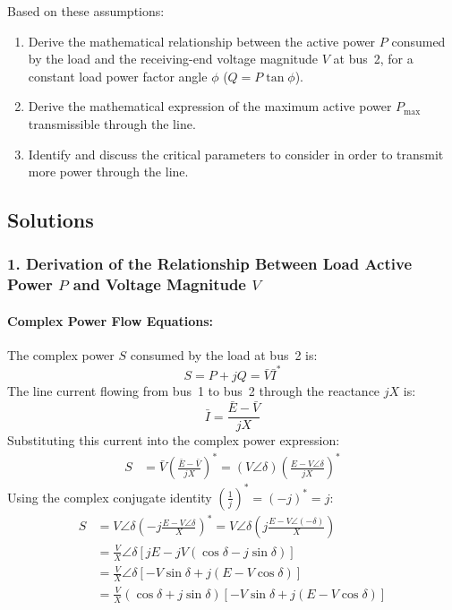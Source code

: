 \begin{enumerate}
    Based on these assumptions:
    \begin{enumerate}
        \item Derive the mathematical relationship between the active power $P$ consumed by the load and the receiving-end voltage magnitude $V$ at bus~2, for a constant load power factor angle $\phi$ ($Q = P\tan\phi$).
        \item Derive the mathematical expression of the maximum active power $P_{\text{max}}$ transmissible through the line.
        \item Identify and discuss the critical parameters to consider in order to transmit more power through the line.
    \end{enumerate}
\end{enumerate}

\newpage
\subsection{Solutions}

\subsubsection*{1. Derivation of the Relationship Between Load Active Power $P$ and Voltage Magnitude $V$}

\paragraph{Complex Power Flow Equations:}
The complex power $S$ consumed by the load at bus~2 is:
\begin{equation}
    S = P + jQ = \bar{V} \bar{I}^*
\end{equation}
The line current flowing from bus~1 to bus~2 through the reactance $jX$ is:
\begin{equation}
    \bar{I} = \frac{\bar{E} - \bar{V}}{jX}
\end{equation}
Substituting this current into the complex power expression:
\begin{align}
    S &= \bar{V} \left( \frac{\bar{E} - \bar{V}}{jX} \right)^* = (V\angle\delta) \left( \frac{E - V\angle\delta}{jX} \right)^*
\end{align}
Using the complex conjugate identity $\left(\frac{1}{j}\right)^* = (-j)^* = j$:
\begin{align}
    S &= V\angle\delta \left( -j \frac{E - V\angle\delta}{X} \right)^* = V\angle\delta \left( j \frac{E - V\angle(-\delta)}{X} \right) \nonumber\\
      &= \frac{V}{X} \angle\delta \left[ j E - j V(\cos\delta - j\sin\delta) \right] \nonumber\\
      &= \frac{V}{X} \angle\delta \left[ -V\sin\delta + j(E - V\cos\delta) \right] \nonumber\\
      &= \frac{V}{X} (\cos\delta + j\sin\delta) \left[ -V\sin\delta + j(E - V\cos\delta) \right]
\end{align}

